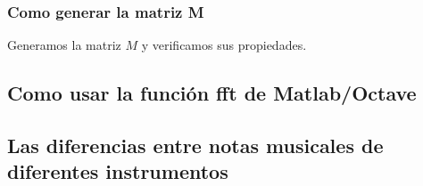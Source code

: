 \subsubsection{Como generar la matriz M}

Generamos la matriz $M$ y verificamos sus propiedades.



\subsection{Como usar la función fft de Matlab/Octave}







\subsection{Las diferencias entre notas musicales de diferentes instrumentos}


